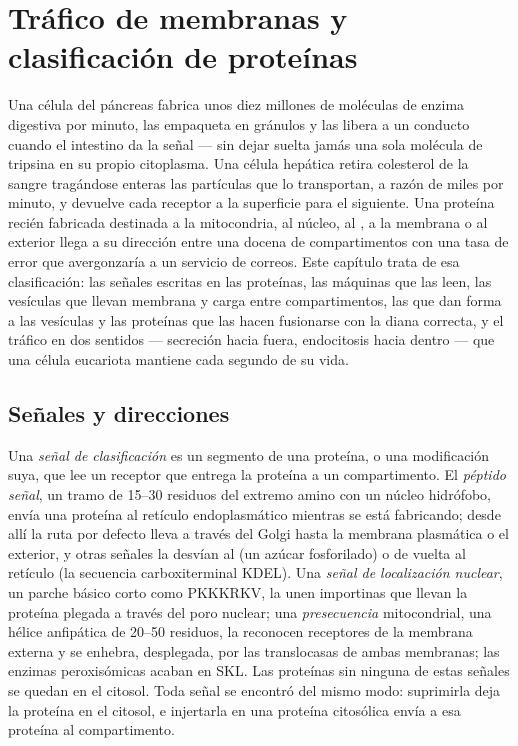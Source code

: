 \chapter{Tráfico de membranas y clasificación de proteínas}\label{ch:b3:membrane-traffic}

Una célula del páncreas fabrica unos diez millones de moléculas de enzima
digestiva por minuto, las empaqueta en gránulos y las libera a un
conducto cuando el intestino da la señal --- sin dejar suelta jamás una
sola molécula de tripsina en su propio citoplasma. Una célula hepática
retira colesterol de la sangre tragándose enteras las partículas que lo
transportan, a razón de miles por minuto, y devuelve cada receptor a la
superficie para el siguiente. Una proteína recién fabricada destinada a
la mitocondria, al núcleo, al , a la membrana o al exterior llega
a su dirección entre una docena de compartimentos con una tasa de error
que avergonzaría a un servicio de correos. Este capítulo trata de esa
clasificación: las señales escritas en las proteínas, las máquinas que
las leen, las vesículas que llevan membrana y carga entre compartimentos,
las  que dan forma a las vesículas y las proteínas que las hacen
fusionarse con la diana correcta, y el tráfico en dos sentidos ---
secreción hacia fuera, endocitosis hacia dentro --- que una célula
eucariota mantiene cada segundo de su vida.

\section{Señales y direcciones}

\begin{definition}\label{def:b3:membrane-traffic:signals}
Una \emph{señal de clasificación} es un segmento de una proteína, o una
modificación suya, que lee un receptor que entrega la proteína a un
compartimento. El \emph{péptido señal}, un tramo de \numrange{15}{30}
residuos del extremo amino con un núcleo hidrófobo, envía una proteína al
retículo endoplasmático mientras se está fabricando; desde allí la ruta
por defecto lleva a través del Golgi hasta la membrana plasmática o el
exterior, y otras señales la desvían al  (un azúcar fosforilado)
o de vuelta al retículo (la secuencia carboxiterminal KDEL). Una
\emph{señal de localización nuclear}, un parche básico corto como PKKKRKV,
la unen importinas que llevan la proteína plegada a través del poro
nuclear; una \emph{presecuencia} mitocondrial, una hélice anfipática de
\numrange{20}{50} residuos, la reconocen receptores de la membrana
externa y se enhebra, desplegada, por las translocasas de ambas
membranas; las enzimas peroxisómicas acaban en SKL. Las proteínas sin
ninguna de estas señales se quedan en el citosol. Toda señal se encontró
del mismo modo: suprimirla deja la proteína en el citosol, e injertarla
en una proteína citosólica envía a esa proteína al compartimento.
\end{definition}

